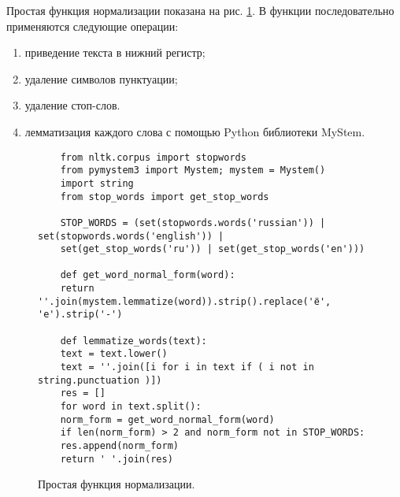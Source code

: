 \documentclass[a4paper, 14pt]{extarticle}
\begin{document}

Простая функция нормализации показана на рис. \ref{norm}. В функции последовательно применяются следующие операции:
\begin{enumerate}
	\item приведение текста в нижний регистр;
	\item удаление символов пунктуации;
	\item удаление стоп-слов.
	\item лемматизация каждого слова с помощью Python библиотеки MyStem.
\end{enumerate}


\begin{figure}
	\centering
	\begin{verbatim}
	from nltk.corpus import stopwords
	from pymystem3 import Mystem; mystem = Mystem()
	import string
	from stop_words import get_stop_words
	
	STOP_WORDS = (set(stopwords.words('russian')) | set(stopwords.words('english')) | 
	set(get_stop_words('ru')) | set(get_stop_words('en')))
	
	def get_word_normal_form(word):
	return ''.join(mystem.lemmatize(word)).strip().replace('ё', 'е').strip('-')
	
	def lemmatize_words(text):
	text = text.lower()
	text = ''.join([i for i in text if ( i not in string.punctuation )])
	res = []
	for word in text.split():
	norm_form = get_word_normal_form(word)
	if len(norm_form) > 2 and norm_form not in STOP_WORDS:
	res.append(norm_form)
	return ' '.join(res)
	\end{verbatim}
	\caption{Простая функция нормализации.}
	\label{norm}
\end{figure}
\end{document}
